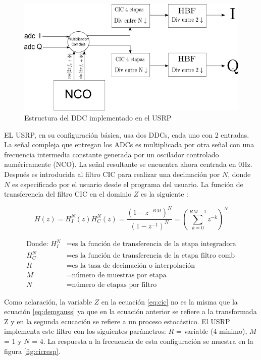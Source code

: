 \begin{figure}[htp]
\centering
	\includegraphics[width=5.5in]{figs/ddc}
	\vspace{0.3in}
	\caption{Estructura del DDC implementado en el USRP}
	\label{fig:ddcblock}
\end{figure}

EL USRP, en su configuraci\'on b\'asica, usa dos DDCs, cada uno con 2
entradas. La se\~nal compleja que entregan los ADCs es multiplicada por otra se\~nal con una
frecuencia intermedia constante generada por un oscilador controlado num\'ericamente (NCO).  La
se\~nal resultante se encuentra ahora centrada en 0Hz. Despu\'es es introducida al filtro CIC para
realizar una decimaci\'on por $N$, donde $N$ es especificado por el usuario desde el programa
del usuario. La funci\'on de transferencia del filtro CIC en el dominio $Z$ es la siguiente
\cite{cic}:

\begin{equation}\label{eq:cic}
H(z)=H_I^N(z)H_C^N(z)=\frac{(1-z^{-RM})^N}{(1-z^{-1})^N}=\left(\sum_{k=0}^{RM-1}z^{-k}\right)^N
\end{equation}

\begin{equation*}
\begin{aligned}
\text{Donde: }H_I^N&=\text{es la funci\'on de transferencia de la etapa
integradora}\\
H_C^N&=\text{es la funci\'on de transferencia de la etapa filtro comb}\\
R&=\text{es la tasa de decimaci\'on o interpolaci\'on}\\
M&=\text{n\'umero de muestras por etapa}\\
N&=\text{n\'umero de etapas por filtro}
\end{aligned}
\end{equation*}

Como aclaraci\'on, la variable $Z$ en la ecuaci\'on \ref{eq:cic} no es la misma que la ecuaci\'on \ref{eq:demgauss} ya que en la
ecuaci\'on anterior se refiere a la transformada Z y en la segunda ecucaci\'on se refiere a un proceso estoc\'astico.
El USRP implementa este filtro con los siguientes par\'ametros: $R$ = variable (4 m\'inimo), $M$ = 1 y $N$ = 4. La respuesta a la
frecuencia de esta configuraci\'on se muestra en la figura \ref{fig:cicresp}.


